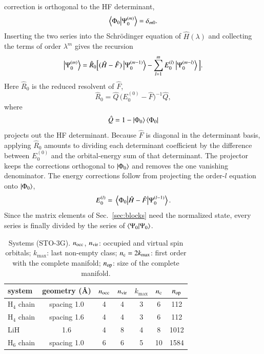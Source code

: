 \documentclass[aip,jcp,reprint,noshowkeys,superscriptaddress]{revtex4-1}
\newcommand{\la}{\lambda}
\begin{document}
correction is orthogonal to the HF determinant,
\begin{equation}
\braket{\Phi_0}{\Psi_0^{(m)}} = \delta_{m0} .
\end{equation}
Inserting the two series into the Schr\"odinger equation of $\hat H(\la)$ and collecting the terms of order
$\la^m$ gives the recursion
\begin{equation}
\ket{\Psi_0^{(m)}} = \hat R_0\Big[(\hat H-\hat F)\ket{\Psi_0^{(m-1)}} - \sum_{l=1}^{m}E_0^{(l)}\ket{\Psi_0^{(m-l)}}\Big] .
\end{equation}
Here $\hat R_0$ is the reduced resolvent of $\hat F$,
\begin{equation}
\hat R_0 = \hat Q\,\big(E_0^{(0)}-\hat F\big)^{-1}\hat Q ,
\end{equation}
where
\begin{equation}
\hat Q = 1-\ket{\Phi_0}\bra{\Phi_0}
\end{equation}
projects out the HF determinant. Because $\hat F$ is diagonal in the determinant basis, applying
$\hat R_0$ amounts to dividing each determinant coefficient by the difference between $E_0^{(0)}$ and the
orbital-energy sum of that determinant. The projector keeps the corrections orthogonal to $\ket{\Phi_0}$
and removes the one vanishing denominator. The energy corrections follow from projecting the order-$l$
equation onto $\ket{\Phi_0}$,
\begin{equation}
E_0^{(l)} = \mel{\Phi_0}{\hat H-\hat F}{\Psi_0^{(l-1)}} .
\end{equation}
Since the matrix elements of
Sec.~\ref{sec:blocks} need the normalized state, every series is finally divided by the series of
$\braket{\Psi_0}{\Psi_0}$.

\begin{table}[hbt!]
\caption{Systems (STO-3G). $n_{\rm occ}$, $n_{\rm vir}$: occupied and virtual spin orbitals; $k_{\max}$: last
non-empty class; $n_{\rm c}=2k_{\max}$: first order with the complete manifold; $n_{\rm op}$: size of the
complete manifold.}
\label{tab:systems}
\begin{tabular}{lcccccc}
\hline\hline
system & geometry (\AA) & $n_{\rm occ}$ & $n_{\rm vir}$ & $k_{\max}$ & $n_{\rm c}$ & $n_{\rm op}$ \\
\hline
H$_4$ chain & spacing 1.0 & 4 & 4 & 3 & 6 & 112 \\
H$_4$ chain & spacing 1.6 & 4 & 4 & 3 & 6 & 112 \\
LiH & 1.6 & 4 & 8 & 4 & 8 & 1012 \\
H$_6$ chain & spacing 1.0 & 6 & 6 & 5 & 10 & 1584 \\
\hline\hline
\end{tabular}
\end{table}
\end{document}
